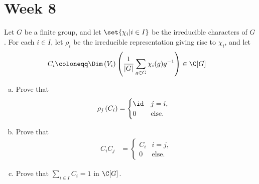 \documentclass[10pt]{mypackage}
\renewcommand{\coloneq}{\coloneqq}
\begin{document}
\section{Week 8}%
\begin{problem}[Exercise 6.15]
  Let $G$ be a finite group, and let $\set{\chi_i | i\in I}$ be the irreducible characters of $G$. For each $i\in I$, let $\rho_i$ be the irreducible representation giving rise to $\chi_i$, and let
  \begin{align*}
    C_i &\coloneq \Dim\left( V_i \right) \left( \frac{1}{\left\vert G \right\vert} \sum_{g\in G} \chi_i(g)g^{-1} \right) \in \C[G]
  \end{align*}
  \begin{enumerate}[(a)]
    \item Prove that
      \begin{align*}
        \rho_j\left( C_i \right) &= \begin{cases}
          \id & j = i,\\
          0 & \text{else}.
        \end{cases}
      \end{align*}
    \item Prove that
      \begin{align*}
        C_iC_j &= \begin{cases}
          C_i & i= j,\\
          0 & \text{else}.
        \end{cases}
      \end{align*}
    \item Prove that $\sum_{i\in I}C_i = 1$ in $\C[G]$.
  \end{enumerate}
\end{problem}
\end{document}
